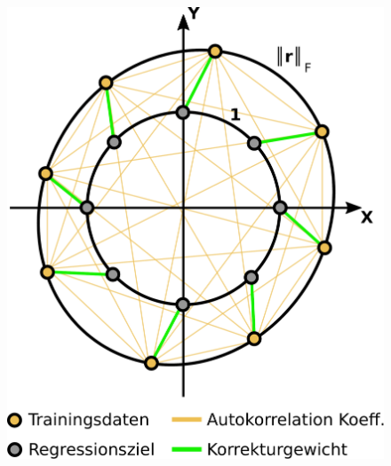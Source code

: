 \documentclass{beamer}
\begin{document}
\begin{frame}
\begin{columns}[c]
\begin{figure}
\begin{overprint}
			\includegraphics[width=\linewidth]{images/GPR_Mapping_Zero_Mean}
		\end{overprint}
	\end{figure}
\end{columns}
\end{frame}
\end{document}
